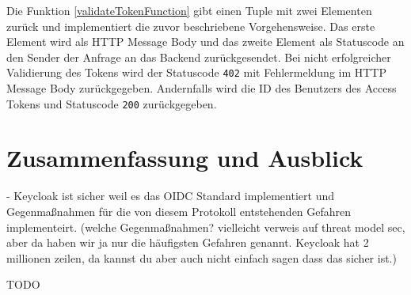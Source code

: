 Die Funktion \ref{validateTokenFunction} gibt einen Tuple mit zwei Elementen zurück und implementiert die zuvor beschriebene Vorgehensweise. Das erste Element wird als HTTP Message Body und das zweite Element als Statuscode an den Sender der Anfrage an das Backend zurückgesendet. Bei nicht erfolgreicher Validierung des Tokens wird der Statuscode \texttt{402} mit Fehlermeldung im HTTP Message Body zurückgegeben. Andernfalls wird die ID des Benutzers des Access Tokens und Statuscode \texttt{200} zurückgegeben.


\section{Zusammenfassung und Ausblick}

- Keycloak ist sicher weil es das OIDC Standard implementiert und Gegenmaßnahmen für die von diesem Protokoll entstehenden Gefahren implementeirt. (welche Gegenmaßnahmen? vielleicht verweis auf threat model sec, aber da haben wir ja nur die häufigsten Gefahren genannt. Keycloak hat 2 millionen zeilen, da kannst du aber auch nicht einfach sagen dass das sicher ist.)

TODO





